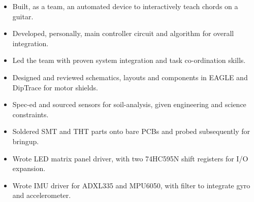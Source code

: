 \documentclass{resume}
\begin{document}

\begin{itemize}
\item Built, as a team, an automated device to interactively teach chords on a guitar.
\item Developed, personally, main controller circuit and algorithm for overall integration.
\item Led the team with proven system integration and task co-ordination skills.
\end{itemize}

\begin{itemize}
\item Designed and reviewed schematics, layouts and components in EAGLE and DipTrace for motor shields. %
\item Spec-ed and sourced sensors for soil-analysis, given engineering and science constraints.
\item Soldered SMT and THT parts onto bare PCBs and probed subsequently for bringup.
\end{itemize}

\begin{itemize}
\item Wrote LED matrix panel driver, with two 74HC595N shift registers for I/O expansion.
\item Wrote IMU driver for ADXL335 and MPU6050, with filter to integrate gyro and accelerometer.
\end{itemize}

\end{document}
